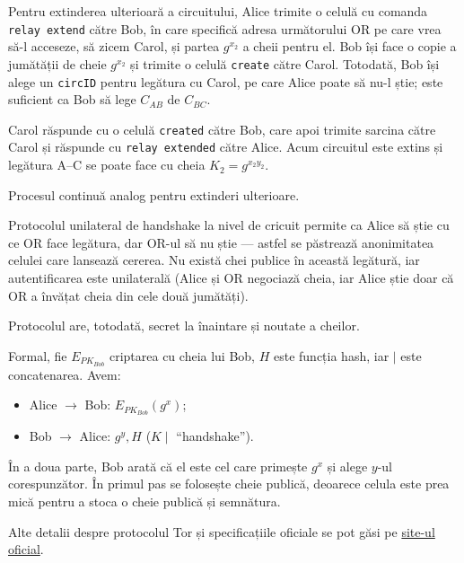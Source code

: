 Pentru extinderea ulterioară a circuitului, Alice trimite o celulă cu
comanda \texttt{relay extend} către Bob, în care specifică adresa
următorului OR pe care vrea să-l acceseze, să zicem Carol, și partea
$ g^{x_2} $ a cheii pentru el. Bob își face o copie a jumătății de cheie
$ g^{x_2} $ și trimite o celulă \texttt{create} către Carol. Totodată,
Bob își alege un \texttt{circID} pentru legătura cu Carol, pe care Alice
poate să nu-l știe; este suficient ca Bob să lege $ C_{AB} $ de $ C_{BC} $.

Carol răspunde cu o celulă \texttt{created} către Bob, care apoi trimite
sarcina către Carol și răspunde cu \texttt{relay extended} către Alice.
Acum circuitul este extins și legătura A--C se poate face cu cheia
$ K_2 = g^{x_2y_2} $.

Procesul continuă analog pentru extinderi ulterioare.

Protocolul unilateral de handshake la nivel de cricuit permite ca Alice să
știe cu ce OR face legătura, dar OR-ul să nu știe --- astfel se
păstrează anonimitatea celulei care lansează cererea. Nu există chei publice
în această legătură, iar autentificarea este unilaterală (Alice și OR
negociază cheia, iar Alice știe doar că OR a învățat cheia din cele
două jumătăți).

Protocolul are, totodată, secret la înaintare și noutate a cheilor.

Formal, fie $ E_{PK_{Bob}} $ criptarea cu cheia lui Bob, $ H $ este funcția
hash, iar $ \mid $ este concatenarea. Avem:
\begin{itemize}
  \item Alice $ \longrightarrow $ Bob: $E_{PK_{Bob}}(g^x) $;
  \item Bob $ \longrightarrow $ Alice: $ g^y, H$ ($ K \mid$ ``handshake'').
\end{itemize}

În a doua parte, Bob arată că el este cel care primește $ g^x $ și alege
$ y $-ul corespunzător. În primul pas se folosește cheie publică, deoarece
celula este prea mică pentru a stoca o cheie publică și semnătura.



\vspace{1cm}

Alte detalii despre protocolul Tor și specificațiile oficiale se pot
găsi pe \href{https://gitweb.torproject.org/torspec.git/tree/}{site-ul oficial}.
